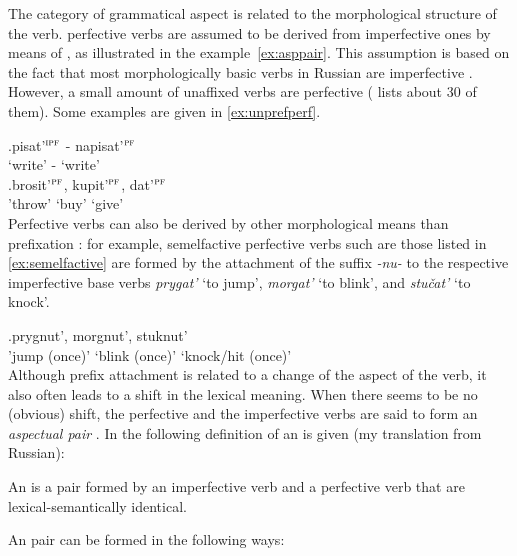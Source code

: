 The category of grammatical aspect is related to the morphological structure of the verb. perfective verbs  are assumed to be derived from imperfective ones by means of , as illustrated in the example~\ref{ex:asppair}. This assumption is based on the fact that most morphologically basic verbs in Russian are imperfective \citep[see, e.g.,][]{Isachenko:60, Forsyth:70}. However, a small amount of unaffixed verbs are perfective (\citealt{Isachenko:60} lists about 30 of them). Some examples are given in \ref{ex:unprefperf}.

\exg.\label{ex:asppair}pisat'$^{\textsc{ipf}}$ - napisat'$^{\textsc{pf}}$\\
`write' - `write'\\

\exg.\label{ex:unprefperf}brosit'$^{\textsc{pf}}$, kupit'$^{\textsc{pf}}$, dat'$^{\textsc{pf}}$\\
'throw' `buy' `give'\\

Perfective verbs  can also be derived by other morphological means than prefixation : for example, semelfactive   perfective verbs   such are those listed in \ref{ex:semelfactive} are formed by the attachment of the suffix \textit{-nu-}   to the respective imperfective base verbs \textit{prygat'} `to jump', \textit{morgat'} `to blink', and \textit{stu\v{c}at'} `to knock'.

\exg.\label{ex:semelfactive \index{semelfactive} }prygnut'\textsuperscript{\PF}, morgnut'\textsuperscript{\PF}, stuknut'\textsuperscript{\PF}\\
{'jump (once)'} {`blink (once)'} {`knock/hit (once)'}\\

Although prefix attachment is related to a change of the aspect of the verb, it also often leads to a shift in the lexical meaning. When there seems to be no (obvious) shift, the perfective and the imperfective verbs  are said to form an \textit{aspectual pair }. In \cite{Rosenthal:76} the following definition of an  is given (my translation from Russian):
\begin{definition}\label{def:pair}
An  is a pair formed by an imperfective verb  and a perfective verb  that are lexical-semantically identical.
\end{definition}
\noindent An   pair can be formed in the following ways:

